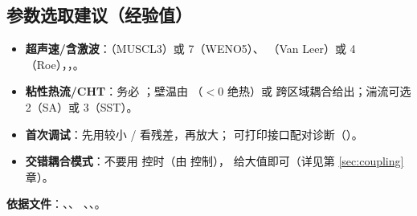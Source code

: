 \subsection{参数选取建议（经验值）}
\begin{itemize}
  \item \textbf{超声速/含激波}：（MUSCL3）或 7（WENO5）、
        （Van Leer）或 4（Roe），，。
  \item \textbf{粘性热流/CHT}：务必 ；壁温由 （$<0$ 绝热）或
        跨区域耦合给出；湍流可选 2（SA）或 3（SST）。
  \item \textbf{首次调试}：先用较小 / 看残差，再放大；
         可打印接口配对诊断（）。
  \item \textbf{交错耦合模式}：不要用  控时（由  控制），
         给大值即可（详见第 \ref{sec:coupling} 章）。
\end{itemize}

\noindent\textbf{依据文件}：、、
、、。
